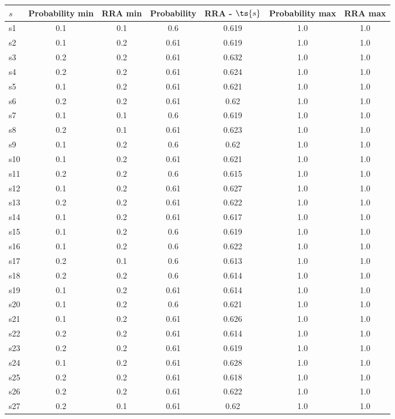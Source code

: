 \documentclass{article}
\begin{document}
\noindent\begin{tabular}{|l|c|c|c|c|c|c|}
\hline
$s$& Probability min & RRA min & Probability & RRA - $\ts{s}$ & Probability max & RRA max\\
\hline
s1 &0.1 & 0.1 & 0.6 & 0.619 & 1.0 & 1.0\\
\hline
s2 &0.1 & 0.2 & 0.61 & 0.619 & 1.0 & 1.0\\
\hline
s3 &0.2 & 0.2 & 0.61 & 0.632 & 1.0 & 1.0\\
\hline
s4 &0.2 & 0.2 & 0.61 & 0.624 & 1.0 & 1.0\\
\hline
s5 &0.1 & 0.2 & 0.61 & 0.621 & 1.0 & 1.0\\
\hline
s6 &0.2 & 0.2 & 0.61 & 0.62 & 1.0 & 1.0\\
\hline
s7 &0.1 & 0.1 & 0.6 & 0.619 & 1.0 & 1.0\\
\hline
s8 &0.2 & 0.1 & 0.61 & 0.623 & 1.0 & 1.0\\
\hline
s9 &0.1 & 0.2 & 0.6 & 0.62 & 1.0 & 1.0\\
\hline
s10 &0.1 & 0.2 & 0.61 & 0.621 & 1.0 & 1.0\\
\hline
s11 &0.2 & 0.2 & 0.6 & 0.615 & 1.0 & 1.0\\
\hline
s12 &0.1 & 0.2 & 0.61 & 0.627 & 1.0 & 1.0\\
\hline
s13 &0.2 & 0.2 & 0.61 & 0.622 & 1.0 & 1.0\\
\hline
s14 &0.1 & 0.2 & 0.61 & 0.617 & 1.0 & 1.0\\
\hline
s15 &0.1 & 0.2 & 0.6 & 0.619 & 1.0 & 1.0\\
\hline
s16 &0.1 & 0.2 & 0.6 & 0.622 & 1.0 & 1.0\\
\hline
s17 &0.2 & 0.1 & 0.6 & 0.613 & 1.0 & 1.0\\
\hline
s18 &0.2 & 0.2 & 0.6 & 0.614 & 1.0 & 1.0\\
\hline
s19 &0.1 & 0.2 & 0.61 & 0.614 & 1.0 & 1.0\\
\hline
s20 &0.1 & 0.2 & 0.6 & 0.621 & 1.0 & 1.0\\
\hline
s21 &0.1 & 0.2 & 0.61 & 0.626 & 1.0 & 1.0\\
\hline
s22 &0.2 & 0.2 & 0.61 & 0.614 & 1.0 & 1.0\\
\hline
s23 &0.2 & 0.2 & 0.61 & 0.619 & 1.0 & 1.0\\
\hline
s24 &0.1 & 0.2 & 0.61 & 0.628 & 1.0 & 1.0\\
\hline
s25 &0.2 & 0.2 & 0.61 & 0.618 & 1.0 & 1.0\\
\hline
s26 &0.2 & 0.2 & 0.61 & 0.622 & 1.0 & 1.0\\
\hline
s27 &0.2 & 0.1 & 0.61 & 0.62 & 1.0 & 1.0\\

\end{tabular}
\end{document}
